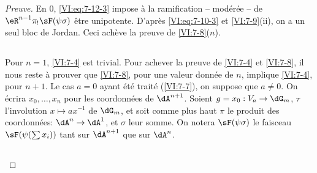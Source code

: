 \begin{proof}[Preuve]
En $0$, \eqref{VI:eq:7-12-3} impose à la ramification -- modérée -- de 
$\eR^{n-1} \pi_! \sF(\psi\sigma)$ être unipotente. D'après 
\eqref{VI:eq:7-10-3} et \ref{VI:7-9}(ii), on a un seul bloc de Jordan. Ceci 
achève la preuve de \ref{VI:7-8}($n$). 





\subsection{}\label{VI:7-13}

Pour $n=1$, \ref{VI:7-4} est trivial. Pour achever la preuve de \ref{VI:7-4} et 
\ref{VI:7-8}, il nous reste à prouver que \ref{VI:7-8}, pour une valeur 
donnée de $n$, implique \ref{VI:7-4}, pour $n+1$. Le cas $a=0$ ayant été 
traité (\ref{VI:7-7}), on suppose que $a\ne 0$. On écrira $x_0,\dots,x_n$ pour 
les coordonnées de $\dA^{n+1}$. Soient $g=x_0:V_a\to \dG_m$, $\tau$ 
l'involution $x\mapsto a x^{-1}$ de $\dG_m$, et soit comme plus haut $\pi$ le 
produit des coordonnées: $\dA^n \to \dA^1$, et $\sigma$ leur somme. On 
notera $\sF(\psi\sigma)$ le faisceau $\sF(\psi(\sum x_i))$ tant sur $\dA^{n+1}$ 
que sur $\dA^n$. 





\subsection{}\label{VI:7-14}


\end{proof}
